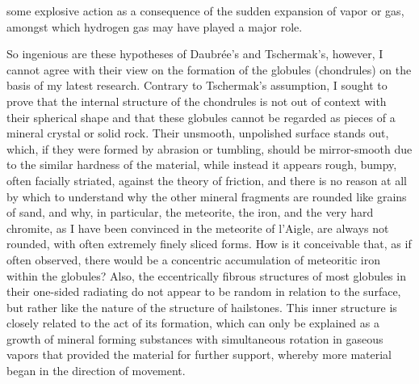 \documentclass[a4paper, 12pt, oneside]{article}
\begin{document}
some explosive action as a consequence of the sudden expansion of vapor or gas, amongst which hydrogen gas may have played a major role.

So ingenious are these hypotheses of Daubrée's and Tschermak's, however, I cannot agree with their view on the formation of the globules (chondrules) on the basis of my latest research. Contrary to Tschermak's assumption, I sought to prove that the internal structure of the chondrules is not out of context with their spherical shape and that these globules cannot be regarded as pieces of a mineral crystal or solid rock. Their unsmooth, unpolished surface stands out, which, if they were formed by abrasion or tumbling, should be mirror-smooth due to the similar hardness of the material, while instead it appears rough, bumpy, often facially striated, against the theory of friction, and there is no reason at all by which to understand why the other mineral fragments are rounded like grains of sand, and why, in particular, the meteorite, the iron, and the very hard chromite, as I have been convinced in the meteorite of l'Aigle, are always not rounded, with often extremely finely sliced forms. How is it conceivable that, as if often observed, there would be a concentric accumulation of meteoritic iron within the globules? Also, the eccentrically fibrous structures of most globules in their one-sided radiating do not appear to be random in relation to the surface, but rather like the nature of the structure of hailstones. This inner structure is closely related to the act of its formation, which can only be explained as a growth of mineral forming substances with simultaneous rotation in gaseous vapors that provided the material for further support, whereby more material began in the direction of movement.
\end{document}
